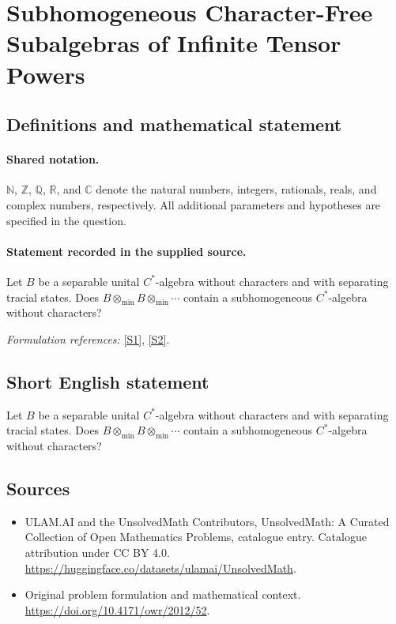 \documentclass[11pt]{article}
\newcommand{\sref}[2]{\hyperlink{source:#1:#2}{[S#2]}}
\begin{document}
\section{Subhomogeneous Character-Free Subalgebras of Infinite Tensor Powers}\label{statement}

\subsection{Definitions and mathematical statement}

\paragraph{Shared notation.}$\mathbb N$, $\mathbb Z$, $\mathbb Q$, $\mathbb R$, and $\mathbb C$ denote the natural numbers, integers, rationals, reals, and complex numbers, respectively. All additional parameters and hypotheses are specified in the question.


\paragraph{Statement recorded in the supplied source.}
Let $B$ be a separable unital $C^*$-algebra without characters and with separating tracial states. Does $B\otimes_{\min}B\otimes_{\min}\cdots$ contain a subhomogeneous $C^*$-algebra without characters?
\par\smallskip\textit{Formulation references:} \sref{statement}{1}, \sref{statement}{2}.
\subsection{Short English statement}
Let $B$ be a separable unital $C^*$-algebra without characters and with separating tracial states. Does $B\otimes_{\min}B\otimes_{\min}\cdots$ contain a subhomogeneous $C^*$-algebra without characters?
\subsection{Sources}
\begin{itemize}
\item[\hypertarget{source:statement:1}{S1}] ULAM.AI and the UnsolvedMath Contributors, UnsolvedMath: A Curated Collection of Open Mathematics Problems, catalogue entry. Catalogue attribution under CC BY 4.0.
\url{https://huggingface.co/datasets/ulamai/UnsolvedMath}.
\item[\hypertarget{source:statement:2}{S2}] Original problem formulation and mathematical context.
\url{https://doi.org/10.4171/owr/2012/52}.
\end{itemize}
\label{end:statement}
\end{document}
